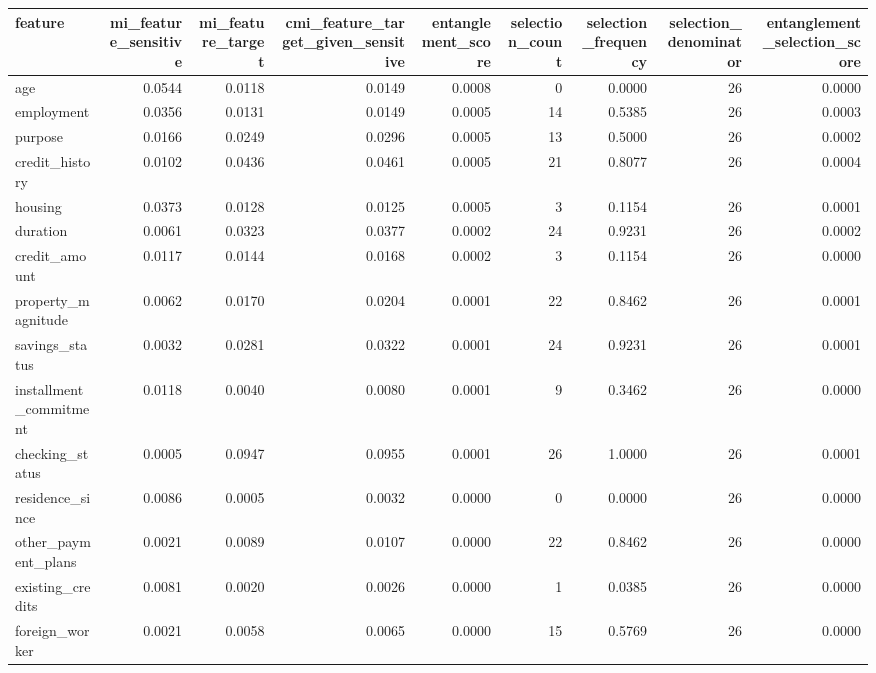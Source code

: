 \begin{tabular}{lrrrrrrrr}
\toprule
feature & mi\_feature\_sensitive & mi\_feature\_target & cmi\_feature\_target\_given\_sensitive & entanglement\_score & selection\_count & selection\_frequency & selection\_denominator & entanglement\_selection\_score \\
\midrule
age & 0.0544 & 0.0118 & 0.0149 & 0.0008 & 0 & 0.0000 & 26 & 0.0000 \\
employment & 0.0356 & 0.0131 & 0.0149 & 0.0005 & 14 & 0.5385 & 26 & 0.0003 \\
purpose & 0.0166 & 0.0249 & 0.0296 & 0.0005 & 13 & 0.5000 & 26 & 0.0002 \\
credit\_history & 0.0102 & 0.0436 & 0.0461 & 0.0005 & 21 & 0.8077 & 26 & 0.0004 \\
housing & 0.0373 & 0.0128 & 0.0125 & 0.0005 & 3 & 0.1154 & 26 & 0.0001 \\
duration & 0.0061 & 0.0323 & 0.0377 & 0.0002 & 24 & 0.9231 & 26 & 0.0002 \\
credit\_amount & 0.0117 & 0.0144 & 0.0168 & 0.0002 & 3 & 0.1154 & 26 & 0.0000 \\
property\_magnitude & 0.0062 & 0.0170 & 0.0204 & 0.0001 & 22 & 0.8462 & 26 & 0.0001 \\
savings\_status & 0.0032 & 0.0281 & 0.0322 & 0.0001 & 24 & 0.9231 & 26 & 0.0001 \\
installment\_commitment & 0.0118 & 0.0040 & 0.0080 & 0.0001 & 9 & 0.3462 & 26 & 0.0000 \\
checking\_status & 0.0005 & 0.0947 & 0.0955 & 0.0001 & 26 & 1.0000 & 26 & 0.0001 \\
residence\_since & 0.0086 & 0.0005 & 0.0032 & 0.0000 & 0 & 0.0000 & 26 & 0.0000 \\
other\_payment\_plans & 0.0021 & 0.0089 & 0.0107 & 0.0000 & 22 & 0.8462 & 26 & 0.0000 \\
existing\_credits & 0.0081 & 0.0020 & 0.0026 & 0.0000 & 1 & 0.0385 & 26 & 0.0000 \\
foreign\_worker & 0.0021 & 0.0058 & 0.0065 & 0.0000 & 15 & 0.5769 & 26 & 0.0000 \\
\bottomrule
\end{tabular}
